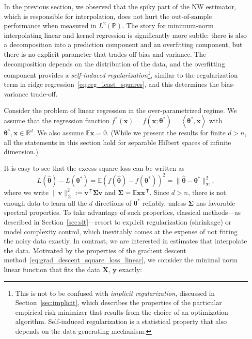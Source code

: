 In the previous section, we observed that the spiky part of the NW estimator, which is responsible for interpolation, does not hurt the out-of-sample performance when measured in
$L^2(\mathbb{P})$.  The story for minimum-norm interpolating linear and kernel regression is significantly more subtle: there is also a decomposition into a prediction component and an overfitting component, but there is no explicit parameter that trades off bias and variance. The decomposition depends on the distribution of the data, and the overfitting component provides a \emph{self-induced
regularization}\footnote{ This is not to be confused with {\em
implicit regularization}, discussed in Section~\ref{sec:implicit},
which describes the properties of the particular empirical risk minimizer that results from the choice of an optimization algorithm.  Self-induced regularization is a statistical property that also depends on the data-generating mechanism.}, similar to the regularization term in ridge regression~\eqref{eq:reg_least_squares},
and this determines the bias-variance trade-off.

Consider the problem of linear regression in the over-parametrized regime. We assume that the regression function $f^*({\boldsymbol x}) =
f({\boldsymbol x};{\boldsymbol \theta}^*)=\left\langle {\boldsymbol \theta}^*,{\boldsymbol x} \right\rangle$ with ${\boldsymbol \theta}^*,{\boldsymbol x}\in
{\mathbb R}^d$.  We also assume ${\mathbb E}{\boldsymbol x}=0$.  (While we present the results for finite $d>n$, all the statements in this section hold for separable Hilbert spaces of infinite dimension.)

It is easy to see that the excess square loss can be written as $$
    L(\widehat{{\boldsymbol \theta}})-L({\boldsymbol \theta}^*)
    = {\mathbb E}\left(f(\widehat{\boldsymbol \theta})-f({\boldsymbol \theta}^*)\right)^2
    = \|\widehat{{\boldsymbol \theta}}-{\boldsymbol \theta}^*\|^2_{{\boldsymbol \Sigma}},
  $$
where we write $\|{\boldsymbol v}\|_\Sigma^2:={\boldsymbol v}^\ensuremath{{\scriptscriptstyle\mathsf{\,T}}}{\boldsymbol \Sigma}{\boldsymbol v}$ and
${\boldsymbol \Sigma} = \mathbb{E} {\boldsymbol x}{\boldsymbol x}^\ensuremath{{\scriptscriptstyle\mathsf{\,T}}}$.
Since $d>n$, there is not enough data to learn all the $d$ directions of ${\boldsymbol \theta}^*$ reliably, unless ${\boldsymbol \Sigma}$ has favorable spectral properties. To take advantage of such properties, classical methods---as described in Section~\ref{sec:slt}---resort to explicit regularization (shrinkage) or model complexity control, which inevitably comes at the expense of not fitting the noisy data exactly. In contrast, we are interested in estimates that interpolate the data. Motivated by the properties of the gradient descent method~\eqref{eq:grad_descent_square_loss_linear}, we consider the minimal norm linear function that fits the data ${\boldsymbol X}$, ${\boldsymbol y}$ exactly:

